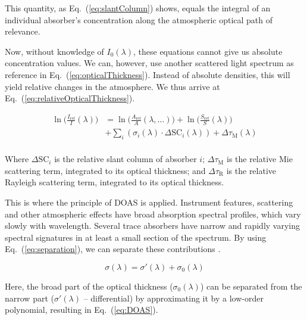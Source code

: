 This quantity, as Eq.~(\ref{eq:slantColumn}) shows, equals the integral
of an individual absorber's concentration along the atmospheric optical
path of relevance.

Now, without knowledge of $I_{0}(\lambda)$, these equations cannot give
us absolute concentration values. We can, however, use another scattered
light spectrum as reference in Eq.~(\ref{eq:opticalThickness}). Instead
of absolute densities, this will yield relative changes in the
atmosphere. We thus arrive at Eq.~(\ref{eq:relativeOpticalThickness}).

\begin{equation}
    \label{eq:relativeOpticalThickness}
    \begin{aligned}
        \ln\Bigg( \frac{I_\mathrm{ref}}{I}(\lambda) \Bigg) &= 
            \ln\Big( \frac{A_\mathrm{ref}}{A}(\lambda,\ldots) \Big) + \ln\Big( 
                \frac{S_\mathrm{ref}}{S}(\lambda) \Big) \nonumber\\
                                                           &+  \sum_{i} 
            (\sigma_{i}(\lambda) \cdot \Delta \mathrm{SC}_{i}(\lambda)) + 
                \Delta \tau_\mathrm{M}(\lambda) \nonumber\\
    \end{aligned}     
\end{equation}

Where $\Delta \mathrm{SC}_{i}$  is the relative slant column of absorber
$i$; $\Delta \tau_\mathrm{M}$  is the relative Mie scattering term,
integrated to its optical thickness; and $\Delta \tau_\mathrm{R}$ is the
relative Rayleigh scattering term, integrated to its optical thickness.

This is where the principle of DOAS is applied. Instrument features,
scattering and other atmospheric effects have broad absorption spectral
profiles, which vary slowly with wavelength. Several trace absorbers
have narrow and rapidly varying spectral signatures in at least a small
section of the spectrum. By using Eq.~(\ref{eq:separation}), we can
separate these contributions \cite{Danckaert2015}.

\begin{equation}
      \label{eq:separation}
      \sigma(\lambda) = \sigma{'}(\lambda) + \sigma_{0}(\lambda)
\end{equation}

Here, the broad part of the optical thickness ($\sigma_{0}(\lambda)$)
can be separated from the narrow part ($\sigma{'}(\lambda)$ --
differential) by approximating it by a low-order polynomial, resulting
in Eq.~(\ref{eq:DOAS}).

